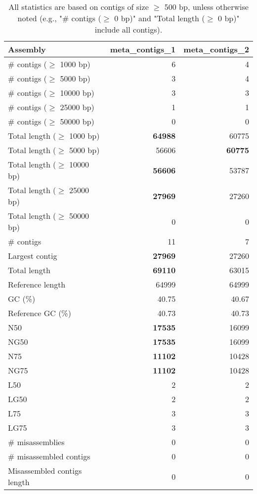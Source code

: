 \documentclass[12pt,a4paper]{article}
\begin{document}
\begin{table}[ht]
\begin{center}
\caption{All statistics are based on contigs of size $\geq$ 500 bp, unless otherwise noted (e.g., "\# contigs ($\geq$ 0 bp)" and "Total length ($\geq$ 0 bp)" include all contigs).}
\begin{tabular}{|l*{2}{|r}|}
\hline
Assembly & meta\_contigs\_1 & meta\_contigs\_2 \\ \hline
\# contigs ($\geq$ 1000 bp) & 6 & 4 \\ \hline
\# contigs ($\geq$ 5000 bp) & 3 & 4 \\ \hline
\# contigs ($\geq$ 10000 bp) & 3 & 3 \\ \hline
\# contigs ($\geq$ 25000 bp) & 1 & 1 \\ \hline
\# contigs ($\geq$ 50000 bp) & 0 & 0 \\ \hline
Total length ($\geq$ 1000 bp) & {\bf 64988} & 60775 \\ \hline
Total length ($\geq$ 5000 bp) & 56606 & {\bf 60775} \\ \hline
Total length ($\geq$ 10000 bp) & {\bf 56606} & 53787 \\ \hline
Total length ($\geq$ 25000 bp) & {\bf 27969} & 27260 \\ \hline
Total length ($\geq$ 50000 bp) & 0 & 0 \\ \hline
\# contigs & 11 & 7 \\ \hline
Largest contig & {\bf 27969} & 27260 \\ \hline
Total length & {\bf 69110} & 63015 \\ \hline
Reference length & 64999 & 64999 \\ \hline
GC (\%) & 40.75 & 40.67 \\ \hline
Reference GC (\%) & 40.73 & 40.73 \\ \hline
N50 & {\bf 17535} & 16099 \\ \hline
NG50 & {\bf 17535} & 16099 \\ \hline
N75 & {\bf 11102} & 10428 \\ \hline
NG75 & {\bf 11102} & 10428 \\ \hline
L50 & 2 & 2 \\ \hline
LG50 & 2 & 2 \\ \hline
L75 & 3 & 3 \\ \hline
LG75 & 3 & 3 \\ \hline
\# misassemblies & 0 & 0 \\ \hline
\# misassembled contigs & 0 & 0 \\ \hline
Misassembled contigs length & 0 & 0 \\ \hline

\end{tabular}
\end{center}
\end{table}
\end{document}
